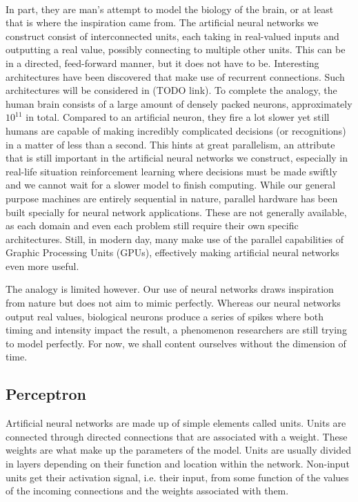 \paragraph{}
In part, they are man's attempt
to model the biology of the brain,
or at least that is where the inspiration came from.
The artificial neural networks we construct
consist of interconnected units,
each taking in real-valued inputs
and outputting a real value,
possibly connecting to multiple other units.
This can be in a directed, feed-forward manner,
but it does not have to be.
Interesting architectures have been discovered
that make use of recurrent connections.
Such architectures will be considered in (TODO link).
To complete the analogy,
the human brain consists of a large amount of densely packed neurons,
approximately $10^{11}$ in total.
Compared to an artificial neuron,
they fire a lot slower
yet still humans are capable of
making incredibly complicated decisions
(or recognitions)
in a matter of less than a second.
This hints at great parallelism,
an attribute that is still important
in the artificial neural networks we construct,
especially in real-life situation reinforcement learning
where decisions must be made swiftly and we cannot wait
for a slower model to finish computing.
While our general purpose machines 
are entirely sequential in nature,
parallel hardware has been built specially
for neural network applications.
These are not generally available,
as each domain and even each problem
still require their own specific architectures.
Still, in modern day, many make use
of the parallel capabilities of
Graphic Processing Units (GPUs),
effectively making artificial neural networks even more useful.

The analogy is limited however.
Our use of neural networks draws inspiration from nature
but does not aim to mimic perfectly.
Whereas our neural networks output real values,
biological neurons produce a series of spikes
where both timing and intensity impact the result, %
a phenomenon researchers are still trying to model perfectly.
For now,
we shall content ourselves without the dimension of time.

\subsection{Perceptron}
Artificial neural networks are made up of simple elements called units.
Units are connected through directed connections
that are associated with a weight.
These weights are what make up the parameters of the model.
Units are usually divided in layers depending on their function
and location within the network.
Non-input units get their activation signal, i.e. their input,
from some function of the values of the incoming connections
and the weights associated with them.

